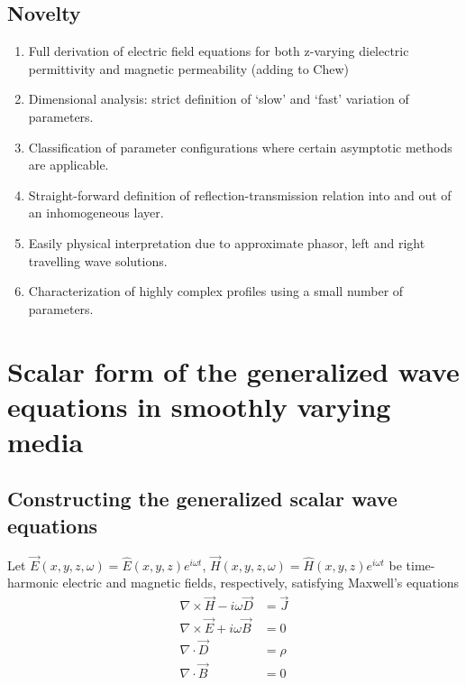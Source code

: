 \documentclass[twocolumn,secnumarabic,amssymb, nobibnotes, aps, prd]{revtex4-1}
\begin{document}
\subsection{Novelty}
\begin{enumerate}
\item Full derivation of electric field equations for both z-varying dielectric permittivity and magnetic permeability (adding to Chew)
\item Dimensional analysis: strict definition of `slow' and `fast' variation of parameters.
\item Classification of parameter configurations where certain asymptotic methods are applicable.
\item Straight-forward definition of reflection-transmission relation into and out of an inhomogeneous layer.
\item Easily physical interpretation due to approximate phasor, left and right travelling wave solutions.
\item Characterization of highly complex profiles using a small number of parameters.

\end{enumerate}





\section{Scalar form of the generalized wave equations in smoothly varying media}
\subsection{Constructing the generalized scalar wave equations}

Let $\overrightarrow{E}(x,y,z,\omega) = \hat{E}(x,y,z)e^{i \omega t}$, $\overrightarrow{H}(x,y,z,\omega) = \hat{H}(x,y,z)e^{i \omega t}$ be time-harmonic electric and magnetic fields, respectively, satisfying Maxwell's equations
\begin{subequations}

	\begin{align}
        \nabla \times \overrightarrow{H}-i \omega \overrightarrow{D} &= \overrightarrow{J}  \label{eqns:CurlH_Maxwell}	\\	
        \nabla \times \overrightarrow{E} + i \omega \overrightarrow{B} &= 0  \label{eqns:CurlE_Maxwell} \\
		\nabla \cdot \overrightarrow{D} &=  \rho	 \label{eqns:DivD_Maxwell}\\		
		\nabla \cdot \overrightarrow{B} &= 0	
	\end{align}
\end{subequations}
 
\end{document}
